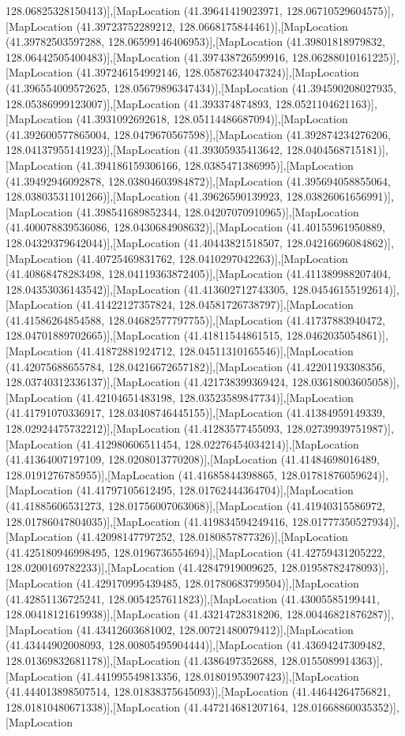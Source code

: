 128.06825328150413)],[MapLocation (41.39641419023971, 128.06710529604575)],[MapLocation (41.39723752289212, 128.0668175844461)],[MapLocation (41.39782503597288, 128.06599146406953)],[MapLocation (41.39801818979832, 128.06442505400483)],[MapLocation (41.397438726599916, 128.06288010161225)],[MapLocation (41.397246154992146, 128.05876234047324)],[MapLocation (41.396554009572625, 128.05679896347434)],[MapLocation (41.394590208027935, 128.05386999123007)],[MapLocation (41.393374874893, 128.0521104621163)],[MapLocation (41.3931092692618, 128.05114486687094)],[MapLocation (41.392600577865004, 128.0479670567598)],[MapLocation (41.392874234276206, 128.04137955141923)],[MapLocation (41.39305935413642, 128.0404568715181)],[MapLocation (41.394186159306166, 128.0385471386995)],[MapLocation (41.39492946092878, 128.03804603984872)],[MapLocation (41.395694058855064, 128.03803531101266)],[MapLocation (41.39626590139923, 128.03826061656991)],[MapLocation (41.398541689852344, 128.04207070910965)],[MapLocation (41.400078839536086, 128.0430684908632)],[MapLocation (41.40155961950889, 128.04329379642044)],[MapLocation (41.40443821518507, 128.04216696084862)],[MapLocation (41.40725469831762, 128.0410297042263)],[MapLocation (41.40868478283498, 128.04119363872405)],[MapLocation (41.411389988207404, 128.04353036143542)],[MapLocation (41.413602712743305, 128.04546155192614)],[MapLocation (41.41422127357824, 128.04581726738797)],[MapLocation (41.41586264854588, 128.04682577797755)],[MapLocation (41.41737883940472, 128.04701889702665)],[MapLocation (41.41811544861515, 128.0462035054861)],[MapLocation (41.41872881924712, 128.04511310165546)],[MapLocation (41.42075688655784, 128.04216672657182)],[MapLocation (41.42201193308356, 128.03740312336137)],[MapLocation (41.421738399369424, 128.03618003605058)],[MapLocation (41.42104651483198, 128.03523589847734)],[MapLocation (41.41791070336917, 128.03408746445155)],[MapLocation (41.41384959149339, 128.02924475732212)],[MapLocation (41.41283577455093, 128.02739939751987)],[MapLocation (41.412980606511454, 128.02276454034214)],[MapLocation (41.41364007197109, 128.0208013770208)],[MapLocation (41.41484698016489, 128.0191276785955)],[MapLocation (41.41685844398865, 128.01781876059624)],[MapLocation (41.41797105612495, 128.01762444364704)],[MapLocation (41.41885606531273, 128.01756007063068)],[MapLocation (41.41940315586972, 128.01786047804035)],[MapLocation (41.419834594249416, 128.01777350527934)],[MapLocation (41.42098147797252, 128.0180857877326)],[MapLocation (41.425180946998495, 128.0196736554694)],[MapLocation (41.42759431205222, 128.0200169782233)],[MapLocation (41.42847919009625, 128.01958782478093)],[MapLocation (41.429170995439485, 128.01780683799504)],[MapLocation (41.42851136725241, 128.0054257611823)],[MapLocation (41.43005585199441, 128.00418121619938)],[MapLocation (41.43214728318206, 128.00446821876287)],[MapLocation (41.43412603681002, 128.00721480079412)],[MapLocation (41.43444902008093, 128.00805495904444)],[MapLocation (41.43694247309482, 128.01369832681178)],[MapLocation (41.4386497352688, 128.0155089914363)],[MapLocation (41.441995549813356, 128.01801953907423)],[MapLocation (41.444013898507514, 128.01838375645093)],[MapLocation (41.44644264756821, 128.01810480671338)],[MapLocation (41.447214681207164, 128.01668860035352)],[MapLocation 